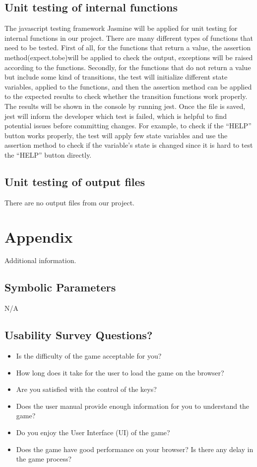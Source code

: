 \documentclass[12pt, titlepage]{article}
\begin{document}
\subsection{Unit testing of internal functions}
The javascript testing framework Jasmine will be applied for unit testing for internal functions in our project. There are many different types of functions that need to be tested. First of all, for the functions that return a value, the assertion method(expect.tobe)will be applied to check the output, exceptions will be raised according to the functions. Secondly, for the functions that do not return a value but include some kind of transitions,  the test will initialize different state variables, applied to the functions, and then the assertion method can be applied to the expected results to check whether the transition functions work properly. The results will be shown in the console by running jest. Once the file is saved, jest will inform the developer which test is failed, which is helpful to find potential issues before committing changes. For example, to check if the “HELP” button works properly, the test will apply few state variables and use the assertion method to check if the variable’s state is changed since it is hard to test the “HELP” button directly.

\subsection{Unit testing of output files}		
There are no output files from our project.





\newpage

\section{Appendix}

Additional information.

\subsection{Symbolic Parameters}

N/A

\subsection{Usability Survey Questions?}
\begin{itemize}
  	\item Is the difficulty of the game acceptable for you?
	\item How long does it take for the user to load the game on the browser?
	\item Are you satisfied with the control of the keys?
	\item Does the user manual provide enough information for you to understand the game? 
	\item Do you enjoy the User Interface (UI) of the game?
	\item Does the game have good performance on your browser? Is there any delay in the game process?
\end{itemize}
\end{document}
